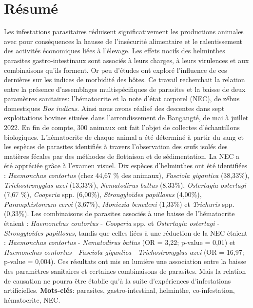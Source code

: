 \chapter*{Résumé}
Les infestations parasitaires réduisent significativement les productions animales avec pour conséquences la hausse de l’insécurité alimentaire et le ralentissement des activités économiques liées à l’élevage. Les effets nocifs des helminthes parasites gastro-intestinaux sont associés à leurs charges, à leurs virulences et aux  combinaisons qu'ils forment. Or peu d’études ont exploré l’influence de ces dernières sur les indices de morbidité des hôtes. Ce travail recherchait la relation entre la présence d'assemblages multispécifiques de parasites et la baisse de deux paramètres sanitaires: l’hématocrite et la note d’état corporel (NEC), de zébus domestiques \textit{Bos indicus}.  Ainsi nous avons réalisé des descentes dans sept exploitations bovines situées dans l’arrondissement de Bangangté, de mai à juillet 2022. En fin de compte, 300 animaux ont fait l’objet de collectes d’échantillons biologiques. L’hématocrite de chaque animal a été déterminé à partir du sang et les espèces de parasites identifiés à travers l'observation des œufs isolés des matières fécales par des méthodes de flottaison et de sédimentation. La NEC a été appréciée grâce à l’examen visuel. Dix espèces d’helminthes ont été identifiées : \textit{Haemonchus contortus} (chez 44,67 \% des animaux), \textit{Fasciola gigantica} (38,33\%), \textit{Trichostrongylus axei} (13,33\%), \textit{Nematodirus battus} (8,33\%), \textit{Ostertagia ostertagi} (7,67 \%), \textit{Cooperia} spp. (6,00\%), \textit{Strongyloïdes papillosus}
(4,00\%), \textit{Paramphistomum cervi} (3,67\%), \textit{Moniezia benedeni} (1,33\%) et \textit{Trichuris} spp. (0,33\%). Les combinaisons de parasites associés à une baisse de l’hématocrite étaient : \textit{Haemonchus contortus} - \textit{Cooperia} spp. et \textit{Ostertagia ostertagi} - \textit{Strongyloides papillosus}, tandis que celles liées à une réduction de la NEC étaient : \textit{Haemonchus contortus} - \textit{Nematodirus battus} (OR = 3,22; p-value = 0,01) et \textit{Haemonchus contortus} - \textit{Fasciola gigantica} - \textit{Trichostrongylus axei} (OR = 16,97; p-value = 0,004). Ces résultats ont mis en lumière une association entre la baisse des paramètres sanitaires et certaines combinaisons de parasites. Mais la relation de causation ne pourra être établie qu'à la suite d’expériences d’infestations artificielles.
\newline
\newline
\textbf{Mots-clés}: parasites, gastro-intestinal, helminthe, co-infestation, hématocrite, NEC.

